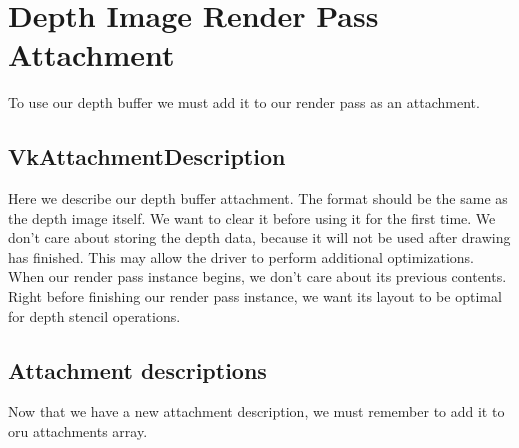\begin{minipage}{\linewidth}{\noindent}
    
\end{minipage}

\section{Depth Image Render Pass Attachment}

To use our depth buffer we must add it to our render pass as an attachment.

\subsection{VkAttachmentDescription}

Here we describe our depth buffer attachment.
The format should be the same as the depth image itself.
We want to clear it before using it for the first time.
We don't care about storing the depth data, because it will not be
used after drawing has finished.
This may allow the driver to perform additional optimizations.
When our render pass instance begins, we don't care about its previous contents.
Right before finishing our render pass instance, we want its layout to be
optimal for depth stencil operations.

\begin{minipage}{\linewidth}{\noindent}
    
\end{minipage}

\subsection{Attachment descriptions}

Now that we have a new attachment description, we must remember to add it to
oru attachments array.

\begin{minipage}{\linewidth}{\noindent}
    
\end{minipage}


